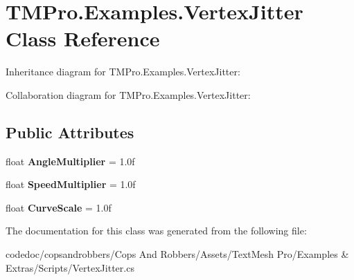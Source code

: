\hypertarget{classTMPro_1_1Examples_1_1VertexJitter}{}\section{T\+M\+Pro.\+Examples.\+Vertex\+Jitter Class Reference}
\label{classTMPro_1_1Examples_1_1VertexJitter}


Inheritance diagram for T\+M\+Pro.\+Examples.\+Vertex\+Jitter\+:


Collaboration diagram for T\+M\+Pro.\+Examples.\+Vertex\+Jitter\+:
\subsection*{Public Attributes}
\begin{DoxyCompactItemize}
\item 
\mbox{\label{classTMPro_1_1Examples_1_1VertexJitter_a48aa2f5018ce1f57c68b316cfc5a76d0}} 
float {\bfseries Angle\+Multiplier} = 1.\+0f
\item 
\mbox{\label{classTMPro_1_1Examples_1_1VertexJitter_a5470bb01ad13ec8b9dab328468bc454d}} 
float {\bfseries Speed\+Multiplier} = 1.\+0f
\item 
\mbox{\label{classTMPro_1_1Examples_1_1VertexJitter_a2950cda059be7e08282d0caee720df49}} 
float {\bfseries Curve\+Scale} = 1.\+0f
\end{DoxyCompactItemize}


The documentation for this class was generated from the following file\+:\begin{DoxyCompactItemize}
\item 
codedoc/copsandrobbers/\+Cops And Robbers/\+Assets/\+Text\+Mesh Pro/\+Examples \& Extras/\+Scripts/Vertex\+Jitter.\+cs\end{DoxyCompactItemize}

